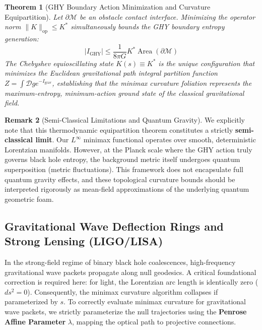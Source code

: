 \documentclass[11pt,reqno]{amsart}
\newtheorem{theorem}{Theorem}[section]
\theoremstyle{definition}
\newtheorem{remark}[theorem]{Remark}
\newcommand{\op}{\mathrm{op}}
\numberwithin{equation}{section}
\begin{document}
\begin{theorem}[GHY Boundary Action Minimization and Curvature Equipartition]
\label{thm:curvature_equipartition}
Let $\partial\mathcal{M}$ be an obstacle contact interface. Minimizing the operator norm $\|K\|_{\op} \le K^*$ simultaneously bounds the GHY boundary entropy generation:
\begin{equation}
|I_{\mathrm{GHY}}| \le \frac{1}{8\pi G} K^* \operatorname{Area}(\partial\mathcal{M})
\end{equation}
The Chebyshev equioscillating state $K(s) \equiv K^*$ is the unique configuration that minimizes the Euclidean gravitational path integral partition function $Z = \int \mathcal{D}g e^{-I_{\mathrm{grav}}}$, establishing that the minimax curvature foliation represents the maximum-entropy, minimum-action ground state of the classical gravitational field.
\end{theorem}

\begin{remark}[Semi-Classical Limitations and Quantum Gravity]
We explicitly note that this thermodynamic equipartition theorem constitutes a strictly \textbf{semi-classical limit}. Our $L^\infty$ minimax functional operates over smooth, deterministic Lorentzian manifolds. However, at the Planck scale where the GHY action truly governs black hole entropy, the background metric itself undergoes quantum superposition (metric fluctuations). This framework does not encapsulate full quantum gravity effects, and these topological curvature bounds should be interpreted rigorously as mean-field approximations of the underlying quantum geometric foam.
\end{remark}

\subsection{Gravitational Wave Deflection Rings and Strong Lensing (LIGO/LISA)}
\label{subsec:lensing_ligo_lisa}
In the strong-field regime of binary black hole coalescences, high-frequency gravitational wave packets propagate along null geodesics. A critical foundational correction is required here: for light, the Lorentzian arc length is identically zero ($ds^2 = 0$). Consequently, the minimax curvature algorithm collapses if parameterized by $s$. 
To correctly evaluate minimax curvature for gravitational wave packets, we strictly parameterize the null trajectories using the \textbf{Penrose Affine Parameter} $\lambda$, mapping the optical path to projective connections.
\end{document}

